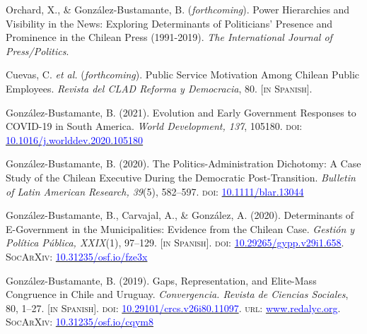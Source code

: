 \begin{publications}

\begin{benumerate}{7}

\item{Orchard, X., \& González-Bustamante, B. ({\itshape forthcoming}). Power Hierarchies and Visibility in the News: Exploring Determinants of Politicians’ Presence and Prominence in the Chilean Press (1991-2019). {\itshape The International Journal of Press/Politics}.}

\item{\small Cuevas, C. {\itshape et al.} ({\itshape forthcoming}). Public Service Motivation Among Chilean Public Employees. {\itshape Revista del CLAD Reforma y Democracia}, 80. {\footnotesize \scshape [in Spanish]}.}\vspace{1mm}

\item{\small Gonz\'alez-Bustamante, B. (2021). Evolution and Early Government Responses to COVID-19 in South America. {\itshape World Development, 137}, 105180. {\scshape doi:} \href{https://doi.org/10.1016/j.worlddev.2020.105180}{\textcolor{blue}{10.1016/j.worlddev.2020.105180}}}\vspace{1mm}

\item{\small Gonz\'alez-Bustamante, B. (2020). The Politics-Administration Dichotomy: A Case Study of the Chilean Executive During the Democratic Post-Transition. {\itshape Bulletin of Latin American Research, 39}(5), 582--597. {\scshape doi}: \href{https://doi.org/10.1111/blar.13044}{\textcolor{blue}{10.1111/blar.13044}}}\vspace{1mm}

\item{\small Gonz\'alez-Bustamante, B., Carvajal, A., \& Gonz\'alez, A. (2020). Determinants of E-Government in the Municipalities: Evidence from the Chilean Case. {\itshape Gesti\'on y Pol\'itica P\'ublica, XXIX}(1), 97--129. {\footnotesize \scshape [in Spanish]}. {\scshape doi:} \href{http://dx.doi.org/10.29265/gypp.v29i1.658}{\textcolor{blue}{10.29265/gypp.v29i1.658}}. {\scshape \footnotesize SocArXiv}: \href{https://doi.org/10.31235/osf.io/fze3x}{\textcolor{blue}{10.31235/osf.io/fze3x}}} \vspace{1mm}

\item{\small Gonz\'alez-Bustamante, B. (2019). Gaps, Representation, and Elite-Mass Congruence in Chile and Uruguay. {\itshape Convergencia. Revista de Ciencias Sociales}, 80, 1--27. {\footnotesize \scshape [in Spanish]}. {\scshape doi}: \href{https://doi.org/10.29101/crcs.v26i80.11097}{\textcolor{blue}{10.29101/crcs.v26i80.11097}}. {\scshape url}:  \href{https://www.redalyc.org/jatsRepo/105/10559568002/index.html}{\textcolor{blue}{www.redalyc.org}}. {\scshape \footnotesize SocArXiv}: \href{https://doi.org/10.31235/osf.io/cqym8}{\textcolor{blue}{10.31235/osf.io/cqym8}}}\vspace{1mm}


\end{benumerate}
\end{publications}
